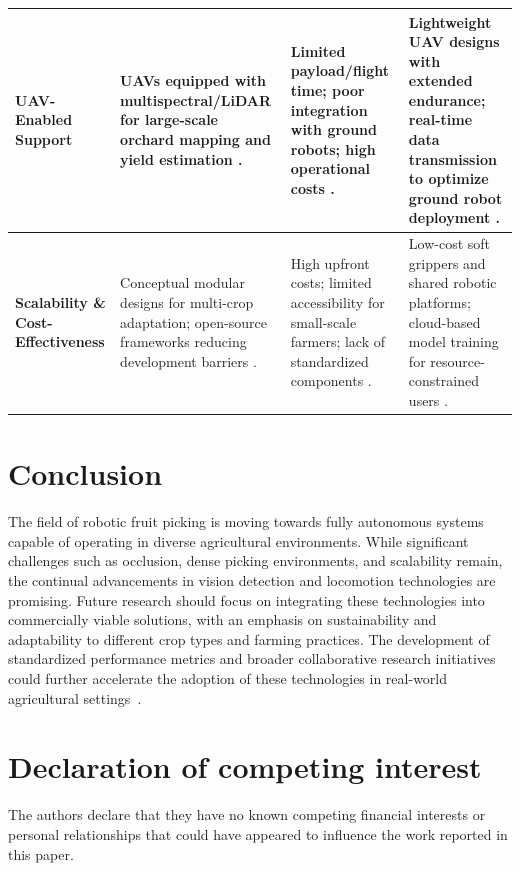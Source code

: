 \documentclass[a4paper,fleqn]{cas-dc}
\begin{document}
\begin{table}[htbp]
\begin{tabular}{p{}p{}p{}p{}}
    \midrule
    \textbf{UAV-Enabled Support} & UAVs equipped with multispectral/LiDAR for large-scale orchard mapping and yield estimation \cite{mohamed2021smart, martos2021ensuring}. & Limited payload/flight time; poor integration with ground robots; high operational costs \cite{martos2021ensuring}. & Lightweight UAV designs with extended endurance; real-time data transmission to optimize ground robot deployment \cite{mohamed2021smart, martos2021ensuring}. \\
    \midrule
    \textbf{Scalability \& Cost-Effectiveness} & Conceptual modular designs for multi-crop adaptation; open-source frameworks reducing development barriers \cite{lytridis2021overview, zhang2024automatic}. & High upfront costs; limited accessibility for small-scale farmers; lack of standardized components \cite{zhang2024automatic, navas2021soft}. & Low-cost soft grippers and shared robotic platforms; cloud-based model training for resource-constrained users \cite{lytridis2021overview, navas2021soft}. \\
    \bottomrule
  \end{tabular}
  \label{tab:trends_summary}
\end{table}

\section{Conclusion}
The field of robotic fruit picking is moving towards fully autonomous systems capable of operating in diverse agricultural environments. While significant challenges such as occlusion, dense picking environments, and scalability remain, the continual advancements in vision detection and locomotion technologies are promising. Future research should focus on integrating these technologies into commercially viable solutions, with an emphasis on sustainability and adaptability to different crop types and farming practices. The development of standardized performance metrics and broader collaborative research initiatives could further accelerate the adoption of these technologies in real-world agricultural settings~\cite{lalander2015vermicomposting, mark2019ethics}.

\section*{Declaration of competing interest}
The authors declare that they have no known competing financial
interests or personal relationships that could have appeared
to influence the work reported in this paper.
\end{document}
